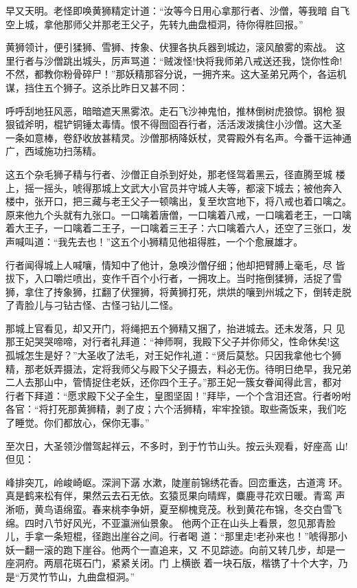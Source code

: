 早又天明。老怪即唤黄狮精定计道：“汝等今日用心拿那行者、沙僧，等我暗
自飞空上城，拿他那师父并那老王父子，先转九曲盘桓洞，待你得胜回报。”

黄狮领计，便引猱狮、雪狮、抟象、伏狸各执兵器到城边，滚风酿雾的索战。
这里行者与沙僧跳出城头，厉声骂道：“贼泼怪!快将我师弟八戒送还我，饶你性命!
不然，都教你粉骨碎尸！”那妖精那容分说，一拥齐来。这大圣弟兄两个，各运机
谋，挡住五个狮子。这杀比昨日又甚不同：

呼呼刮地狂风恶，暗暗遮天黑雾浓。走石飞沙神鬼怕，推林倒树虎狼惊。钢枪
狠狠钺斧明，棍铲铜锤太毒情。恨不得囫囵吞行者，活活泼泼擒住小沙僧。这大圣
一条如意棒，卷舒收放甚精灵。沙僧那柄降妖杖，灵霄殿外有名声。今番干运神通
广，西域施功扫荡精。

这五个杂毛狮子精与行者、沙僧正自杀到好处，那老怪驾着黑云，径直腾至城
楼上，摇一摇头，唬得那城上文武大小官员并守城人夫等，都滚下城去；被他奔入
楼中，张开口，把三藏与老王父子一顿噙出，复至坎宫地下，将八戒也着口噙之。
原来他九个头就有九张口。一口噙着唐僧，一口噙着八戒，一口噙着老王，一口噙
着大王子，一口噙着二王子，一口噙着三王子：六口噙着六人，还空了三张口，发
声喊叫道：“我先去也！”这五个小狮精见他祖得胜，一个个愈展雄才。

行者闻得城上人喊嚷，情知中了他计，急唤沙僧仔细；他却把臂膊上毫毛，尽
皆拔下，入口嚼烂喷出，变作千百个小行者，一拥攻上。当时拖倒猱狮，活捉了雪
狮，拿住了抟象狮，扛翻了伏狸狮，将黄狮打死，烘烘的嚷到州城之下，倒转走脱
了青脸儿与刁钻古怪、古怪刁钻儿二怪。

那城上官看见，却又开门，将绳把五个狮精又捆了，抬进城去。还未发落，只
见那王妃哭哭啼啼，对行者礼拜道：“神师啊，我殿下父子并你师父，性命休矣!这
孤城怎生是好？”大圣收了法毛，对王妃作礼道：“贤后莫愁。只因我拿他七个狮
精，那老妖弄摄法，定将我师父与殿下父子摄去，料必无伤。待明日绝早，我兄弟
二人去那山中，管情捉住老妖，还你四个王子。”那王妃一簇女眷闻得此言，都对
行者下拜道：“愿求殿下父子全生，皇图坚固！”拜毕，一个个含泪还宫。行者吩咐
各官：“将打死那黄狮精，剥了皮；六个活狮精，牢牢拴锁。取些斋饭来，我们吃
了睡觉。你们都放心，保你无事。”

至次日，大圣领沙僧驾起祥云，不多时，到于竹节山头。按云头观看，好座高
山!但见：

峰排突兀，岭峻崎岖。深涧下潺水漱，陡崖前锦绣花香。回峦重迭，古道湾
环。真是鹤来松有伴，果然云去石无依。玄猿觅果向晴辉，麋鹿寻花欢日暖。青鸾
声淅呖，黄鸟语绵蛮。春来桃李争妍，夏至柳槐竞茂。秋到黄花布锦，冬交白雪飞
绵。四时八节好风光，不亚瀛洲仙景象。
他两个正在山头上看景，忽见那青脸儿，手拿一条短棍，径跑出崖谷之间。行者喝
道：“那里走!老孙来也！”唬得那小妖一翻一滚的跑下崖谷。他两个一直追来，又
不见踪迹。向前又转几步，却是一座洞府。两扇花斑石门，紧紧关闭。门上横嵌
着一块石版，楷镌了十个大字，乃是“万灵竹节山，九曲盘桓洞。”

